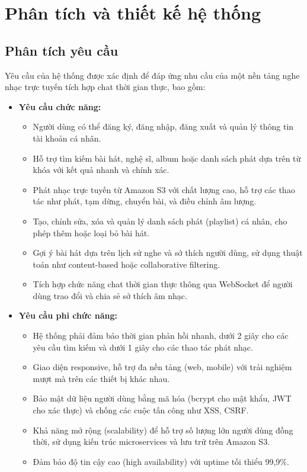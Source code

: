 \documentclass[a4paper,12pt]{report}
\begin{document}
\chapter{Phân tích và thiết kế hệ thống}

\section{Phân tích yêu cầu}
Yêu cầu của hệ thống được xác định để đáp ứng nhu cầu của một nền tảng nghe nhạc trực tuyến tích hợp chat thời gian thực, bao gồm:

\begin{itemize}
    \item \textbf{Yêu cầu chức năng:}
        \begin{itemize}
            \item Người dùng có thể đăng ký, đăng nhập, đăng xuất và quản lý thông tin tài khoản cá nhân.
            \item Hỗ trợ tìm kiếm bài hát, nghệ sĩ, album hoặc danh sách phát dựa trên từ khóa với kết quả nhanh và chính xác.
            \item Phát nhạc trực tuyến từ Amazon S3 với chất lượng cao, hỗ trợ các thao tác như phát, tạm dừng, chuyển bài, và điều chỉnh âm lượng.
            \item Tạo, chỉnh sửa, xóa và quản lý danh sách phát (playlist) cá nhân, cho phép thêm hoặc loại bỏ bài hát.
            \item Gợi ý bài hát dựa trên lịch sử nghe và sở thích người dùng, sử dụng thuật toán như content-based hoặc collaborative filtering.
            \item Tích hợp chức năng chat thời gian thực thông qua WebSocket để người dùng trao đổi và chia sẻ sở thích âm nhạc.
        \end{itemize}
    \item \textbf{Yêu cầu phi chức năng:}
        \begin{itemize}
            \item Hệ thống phải đảm bảo thời gian phản hồi nhanh, dưới 2 giây cho các yêu cầu tìm kiếm và dưới 1 giây cho các thao tác phát nhạc.
            \item Giao diện responsive, hỗ trợ đa nền tảng (web, mobile) với trải nghiệm mượt mà trên các thiết bị khác nhau.
            \item Bảo mật dữ liệu người dùng bằng mã hóa (bcrypt cho mật khẩu, JWT cho xác thực) và chống các cuộc tấn công như XSS, CSRF.
            \item Khả năng mở rộng (scalability) để hỗ trợ số lượng lớn người dùng đồng thời, sử dụng kiến trúc microservices và lưu trữ trên Amazon S3.
            \item Đảm bảo độ tin cậy cao (high availability) với uptime tối thiểu 99,9\%.
        \end{itemize}
\end{itemize}
\end{document}
